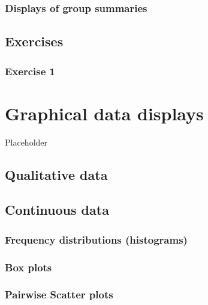 \documentclass[english,10pt,a4paper,oneside]{book}
\begin{document}
\hypertarget{displays-of-group-summaries}{%
\subsection{Displays of group summaries}\label{displays-of-group-summaries}}

\hypertarget{exercises}{%
\section{Exercises}\label{exercises}}

\hypertarget{exercise-1}{%
\subsection{Exercise 1}\label{exercise-1}}

\hypertarget{graphical-data-displays}{%
\chapter{Graphical data displays}\label{graphical-data-displays}}

Placeholder

\hypertarget{qualitative-data-1}{%
\section{Qualitative data}\label{qualitative-data-1}}

\hypertarget{continuous-data-1}{%
\section{Continuous data}\label{continuous-data-1}}

\hypertarget{frequency-distributions-histograms}{%
\subsection{Frequency distributions (histograms)}\label{frequency-distributions-histograms}}

\hypertarget{box-plots}{%
\subsection{Box plots}\label{box-plots}}

\hypertarget{pairwise-scatter-plots}{%
\subsection{Pairwise Scatter plots}\label{pairwise-scatter-plots}}
\end{document}
